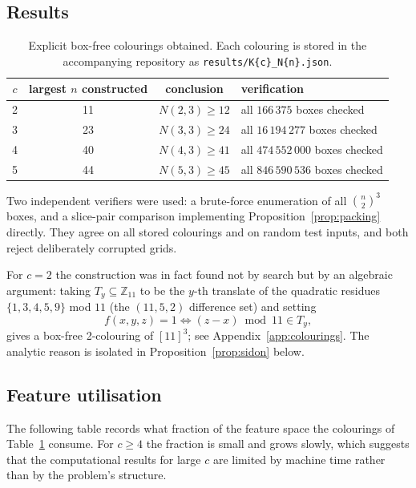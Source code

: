 \documentclass[11pt]{article}
\theoremstyle{definition}
\begin{document}
\subsection{Results}
\begin{table}[h]
\centering
\begin{tabular}{cccl}
\toprule
$c$ & largest $n$ constructed & conclusion & verification \\
\midrule
2 & 11 & $N(2,3)\ge 12$ & all $166\,375$ boxes checked \\
3 & 23 & $N(3,3)\ge 24$ & all $16\,194\,277$ boxes checked \\
4 & 40 & $N(4,3)\ge 41$ & all $474\,552\,000$ boxes checked \\
5 & 44 & $N(5,3)\ge 45$ & all $846\,590\,536$ boxes checked \\
\bottomrule
\end{tabular}
\caption{Explicit box-free colourings obtained. Each colouring is stored in the
accompanying repository as \texttt{results/K\{c\}\_N\{n\}.json}.}
\label{tab:construct}
\end{table}

Two independent verifiers were used: a brute-force enumeration of all
$\binom{n}{2}^3$ boxes, and a slice-pair comparison implementing
Proposition~\ref{prop:packing} directly. They agree on all stored colourings and on
random test inputs, and both reject deliberately corrupted grids.

For $c=2$ the construction was in fact found not by search but by an algebraic argument:
taking $T_y\subseteq\mathbb{Z}_{11}$ to be the $y$-th translate of the quadratic
residues $\{1,3,4,5,9\}$ mod $11$ (the $(11,5,2)$ difference set) and setting
\begin{equation}\label{eq:qr}
f(x,y,z)=1 \iff (z-x) \bmod 11 \in T_y ,
\end{equation}
gives a box-free 2-colouring of $[11]^3$; see Appendix~\ref{app:colourings}. The
analytic reason is isolated in Proposition~\ref{prop:sidon} below.

\subsection{Feature utilisation}
The following table records what fraction of the feature space the colourings of
Table~\ref{tab:construct} consume. For $c\ge4$ the fraction is small and grows slowly,
which suggests that the computational results for large $c$ are limited by machine time
rather than by the problem's structure.
\end{document}
